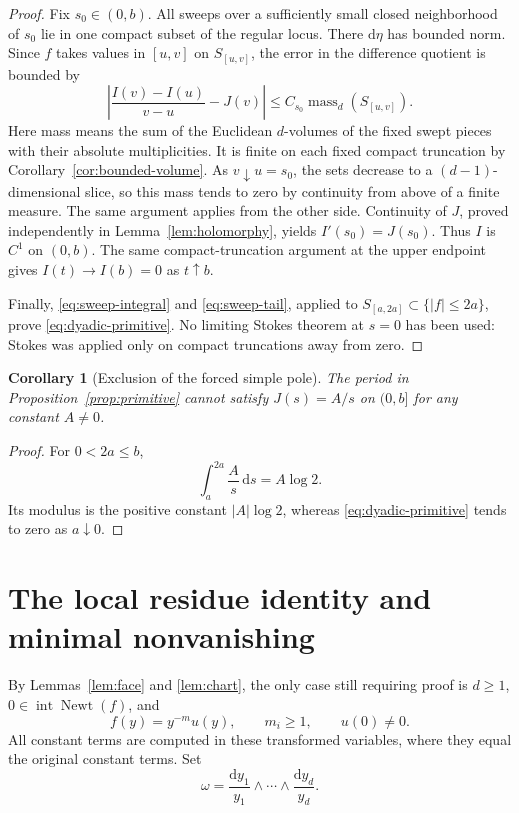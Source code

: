 \documentclass[11pt]{article}
\numberwithin{equation}{section}
\newtheorem{corollary}[theorem]{Corollary}
\theoremstyle{definition}
\theoremstyle{remark}
\newcommand{\Newt}{\operatorname{Newt}}
\newcommand{\Int}{\operatorname{int}}
\newcommand{\mass}{\operatorname{mass}}
\newcommand{\dd}{\mathrm d}
\begin{document}
\begin{proof}
Fix $s_0\in(0,b)$. All sweeps over a sufficiently small closed
neighborhood of $s_0$ lie in one compact subset of the regular locus.
There $\dd\eta$ has bounded norm. Since $f$ takes values in $[u,v]$
on $S_{[u,v]}$, the error in the difference quotient is bounded by
\begin{equation}\label{eq:quotient-error}
 \left|\frac{I(v)-I(u)}{v-u}-J(v)\right|
 \le C_{s_0}\mass_d(S_{[u,v]}).
\end{equation}
Here mass means the sum of the Euclidean $d$-volumes of the fixed
swept pieces with their absolute multiplicities. It is finite on each
fixed compact truncation by Corollary~\ref{cor:bounded-volume}.
As $v\downarrow u=s_0$, the sets decrease to a $(d-1)$-dimensional
slice, so this mass tends to zero by continuity from above of a finite
measure. The same argument applies from the other side. Continuity of
$J$, proved independently in Lemma~\ref{lem:holomorphy}, yields
$I'(s_0)=J(s_0)$. Thus $I$ is $C^1$ on $(0,b)$. The same
compact-truncation argument at the upper endpoint gives
$I(t)\to I(b)=0$ as $t\uparrow b$.

Finally, \eqref{eq:sweep-integral} and \eqref{eq:sweep-tail}, applied
to $S_{[a,2a]}\subset\{|f|\le2a\}$, prove
\eqref{eq:dyadic-primitive}. No limiting Stokes theorem at $s=0$ has
been used: Stokes was applied only on compact truncations away from zero.
\end{proof}

\begin{corollary}[Exclusion of the forced simple pole]\label{cor:no-pole}
The period in Proposition~\ref{prop:primitive} cannot satisfy
$J(s)=A/s$ on $(0,b]$ for any constant $A\ne0$.
\end{corollary}
\begin{proof}
For $0<2a\le b$,
\[
 \int_a^{2a}\frac{A}{s}\,\dd s=A\log2.
\]
Its modulus is the positive constant $|A|\log2$, whereas
\eqref{eq:dyadic-primitive} tends to zero as $a\downarrow0$.
\end{proof}

\section{The local residue identity and minimal nonvanishing}\label{sec:residue}
By Lemmas~\ref{lem:face} and \ref{lem:chart}, the only case still
requiring proof is $d\ge1$, $0\in\Int\Newt(f)$, and
\[
 f(y)=y^{-m}u(y),\qquad m_i\ge1,\qquad u(0)\ne0.
\]
All constant terms are computed in these transformed variables, where
they equal the original constant terms. Set
\[
 \omega=\frac{\dd y_1}{y_1}\wedge\cdots\wedge\frac{\dd y_d}{y_d}.
\]
\end{document}
